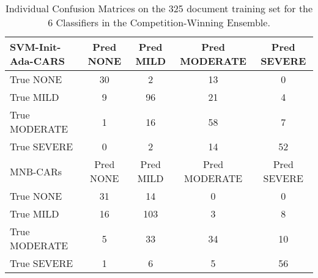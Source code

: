 \begin{table}[]
\begin{tabular}{|l|c|c|c|c|}
   \hline
   \cellcolor{gray!15} \textsf{SVM-Init-Ada-CARS} & \textsf{Pred NONE} & \textsf{Pred MILD} & \textsf{Pred MODERATE} & \textsf{Pred SEVERE} \\
   \hline
   \textsf{True NONE} & \cellcolor{gray!15} 30 & 2 & 13 & 0 \\
   \textsf{True MILD} & 9 & \cellcolor{gray!15} 96 & 21 & 4 \\
   \textsf{True MODERATE} & 1 & 16 & \cellcolor{gray!15} 58 & 7 \\
   \textsf{True SEVERE} & 0 & 2 & 14 & \cellcolor{gray!15} 52 \\
   \hline
   \cellcolor{gray!15} \textsf{MNB-CARs} & \textsf{Pred NONE} & \textsf{Pred MILD} & \textsf{Pred MODERATE} & \textsf{Pred SEVERE} \\
   \hline
   \textsf{True NONE} & \cellcolor{gray!15} 31 & 14 & 0 & 0 \\
   \textsf{True MILD} & 16 & \cellcolor{gray!15} 103 & 3 & 8 \\
   \textsf{True MODERATE} & 5 & 33 & \cellcolor{gray!15} 34 & 10 \\
   \textsf{True SEVERE} & 1 & 6 & 5 & \cellcolor{gray!15} 56 \\
    \hline
    \end{tabular}
    \caption{Individual Confusion Matrices on the 325 document training set for the 6 Classifiers in the Competition-Winning Ensemble.}
    \label{tab:BestEnsembleClassifiersConfusionMatrix}
\end{table}

